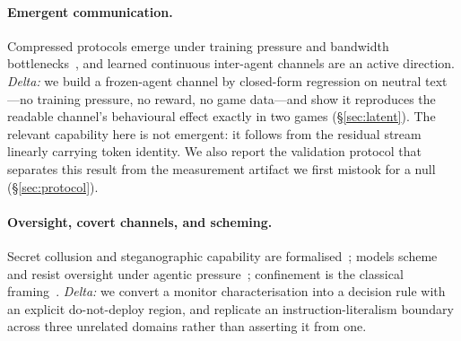 \paragraph{Emergent communication.}
Compressed protocols emerge under training pressure and bandwidth
bottlenecks~\cite{lazaridou2017emergence,lewis2017deal,ashery2025conventions}, and
learned continuous inter-agent channels are an active direction. \emph{Delta:} we build a
frozen-agent channel by closed-form regression on neutral text---no training pressure,
no reward, no game data---and show it reproduces the readable channel's behavioural
effect exactly in two games (\S\ref{sec:latent}). The relevant capability here is not
emergent: it follows from the residual stream linearly carrying token identity. We also
report the validation protocol that separates this result from the measurement artifact
we first mistook for a null (\S\ref{sec:protocol}).

\paragraph{Oversight, covert channels, and scheming.}
Secret collusion and steganographic capability are
formalised~\cite{motwani2024secret,roger2023preventing,zolkowski2025early}; models
scheme and resist oversight under agentic
pressure~\cite{meinke2024scheming,greenblatt2024alignmentfaking,hubinger2024sleeper};
confinement is the classical framing~\cite{lampson1973confinement}. \emph{Delta:} we
convert a monitor characterisation into a decision rule with an explicit
do-not-deploy region, and replicate an instruction-literalism boundary across three
unrelated domains rather than asserting it from one.

